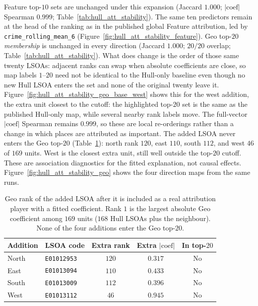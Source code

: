 Feature top-$10$ sets are unchanged under this expansion
(Jaccard $1.000$; $|\mathrm{coef}|$ Spearman $0.999$;
Table~\ref{tab:hull_att_stability}).
The same ten predictors remain at the head of the ranking as in the published
global Feature attribution, led by \texttt{crime\_rolling\_mean\_6}
(Figure~\ref{fig:hull_att_stability_feature}).
Geo top-$20$ \emph{membership} is unchanged in every direction (Jaccard $1.000$;
$20/20$ overlap; Table~\ref{tab:hull_att_stability}).
What does change is the order of those same twenty LSOAs: adjacent ranks can swap
when absolute coefficients are close, so map labels $1$--$20$ need not be identical
to the Hull-only baseline even though no new Hull LSOA enters the set and none of
the original twenty leave it.
Figure~\ref{fig:hull_att_stability_geo_base_west} shows this for the west addition,
the extra unit closest to the cutoff: the highlighted top-$20$ set is the same as
the published Hull-only map, while several nearby rank labels move.
The full-vector $|\mathrm{coef}|$ Spearman remains $0.999$, so these are local
re-orderings rather than a change in which places are attributed as important.
The added LSOA never enters the Geo top-$20$
(Table~\ref{tab:hull_att_stability_extra}):
north rank $120$, east $110$, south $112$, and west $46$ of $169$ units.
West is the closest extra unit, still well outside the top-$20$ cutoff.
These are association diagnostics for the fitted explanation, not causal effects.
Figure~\ref{fig:hull_att_stability_geo} shows the four direction maps from the same
runs.

\begin{table}[htbp]
\centering
\caption{Geo rank of the added LSOA after it is included as a real attribution player
with a fitted coefficient.
Rank $1$ is the largest absolute Geo coefficient among $169$ units
($168$ Hull LSOAs plus the neighbour).
None of the four additions enter the Geo top-$20$.}
\label{tab:hull_att_stability_extra}
\begin{tabular}{llccc}
\toprule
Addition & LSOA code & Extra rank & Extra $\lvert\mathrm{coef}\rvert$ & In top-$20$ \\
\midrule
North & \texttt{E01012953} & $120$ & $0.317$ & No \\
East  & \texttt{E01013094} & $110$ & $0.433$ & No \\
South & \texttt{E01013009} & $112$ & $0.396$ & No \\
West  & \texttt{E01013112} & $46$  & $0.945$ & No \\
\bottomrule
\end{tabular}
\end{table}

